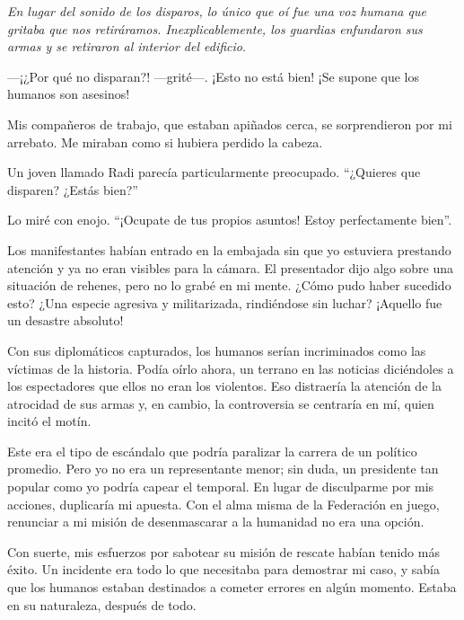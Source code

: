     \textit{En lugar del sonido de los disparos, lo único que oí fue una voz humana que gritaba que nos retiráramos. Inexplicablemente, los guardias enfundaron sus armas y se retiraron al interior del edificio}.

    —¡¿Por qué no disparan?! —grité—. ¡Esto no está bien! ¡Se supone que los humanos son asesinos!

    Mis compañeros de trabajo, que estaban apiñados cerca, se sorprendieron por mi arrebato. Me miraban como si hubiera perdido la cabeza.

    Un joven llamado Radi parecía particularmente preocupado. ``¿Quieres que disparen? ¿Estás bien?''


    Lo miré con enojo. ``¡Ocupate de tus propios asuntos! Estoy perfectamente bien''.

    Los manifestantes habían entrado en la embajada sin que yo estuviera prestando atención y ya no eran visibles para la cámara. El presentador dijo algo sobre una situación de rehenes, pero no lo grabé en mi mente. ¿Cómo pudo haber sucedido esto? ¿Una especie agresiva y militarizada, rindiéndose sin luchar? ¡Aquello fue un desastre absoluto!

    Con sus diplomáticos capturados, los humanos serían incriminados como las víctimas de la historia. Podía oírlo ahora, un terrano en las noticias diciéndoles a los espectadores que ellos no eran los violentos. Eso distraería la atención de la atrocidad de sus armas y, en cambio, la controversia se centraría en mí, quien incitó el motín.

    Este era el tipo de escándalo que podría paralizar la carrera de un político promedio. Pero yo no era un representante menor; sin duda, un presidente tan popular como yo podría capear el temporal. En lugar de disculparme por mis acciones, duplicaría mi apuesta. Con el alma misma de la Federación en juego, renunciar a mi misión de desenmascarar a la humanidad no era una opción.

    Con suerte, mis esfuerzos por sabotear su misión de rescate habían tenido más éxito. Un incidente era todo lo que necesitaba para demostrar mi caso, y sabía que los humanos estaban destinados a cometer errores en algún momento. Estaba en su naturaleza, después de todo.
